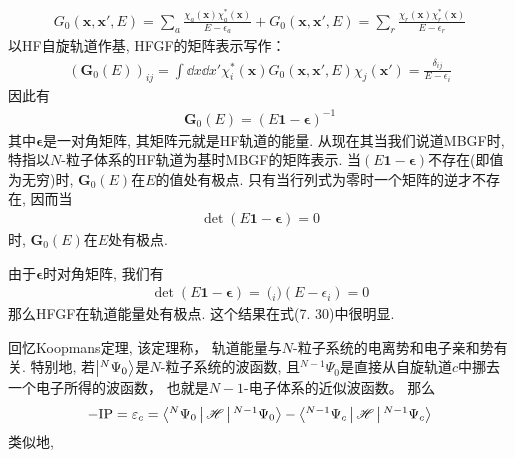 \begin{align}
G_0(\mathbf{x,x'},E) = \sum_a \frac{\chi_a(\mathbf{x})\chi_a^*(\mathbf{x})}{E-\epsilon_a} + G_0(\mathbf{x,x'},E) = \sum_r \frac{\chi_r(\mathbf{x})\chi_r^*(\mathbf{x})}{E-\epsilon_r}
\end{align}
以HF自旋轨道作基, 
HFGF的矩阵表示写作：
\begin{align}
(\mathbf{G}_0(E))_{ij} = \int\dd{x}\dd{x'}\chi_i^*(\mathbf{x})G_0(\mathbf{x,x'},E)\chi_j(\mathbf{x'}) = \frac{\delta_{ij}}{E - \epsilon_i}
\end{align}
因此有
\begin{align}
\mathbf{G}_0(E) = (E\mathbf{1} - \bm{\epsilon})^{-1}
\end{align}
其中$\bm{\epsilon}$是一对角矩阵, 
其矩阵元就是HF轨道的能量. 
从现在其当我们说道MBGF时, 
特指以$N$-粒子体系的HF轨道为基时MBGF的矩阵表示. 
 当$(E\bm{1-\epsilon})$不存在(即值为无穷)时, 
$\mathbf{G}_0(E)$在$E$的值处有极点. 
只有当行列式为零时一个矩阵的逆才不存在, 
因而当
\begin{align*}
\det(E\bm{1-\epsilon})=0
\end{align*}
时, 
$\mathbf{G}_0(E)$在$E$处有极点.


由于$\bm{\epsilon}$时对角矩阵, 
我们有
\begin{align}
\det(E\bm{1-\epsilon}) = \pod_i (E-\epsilon_i) = 0
\end{align}
那么HFGF在\hft 轨道能量处有极点. 
这个结果在式(7.
30)中很明显.


回忆Koopmans定理, 
该定理称，
轨道能量与$N$-粒子系统的电离势和电子亲和势有关. 
特别地, 
若$\Ket{{}^N\Psi_0}$是$N$-粒子系统的\hft 波函数, 
且${}^{N-1}\Psi_0$是直接从自旋轨道$c$中挪去一个电子所得的波函数，
也就是$N-1$-电子体系的近似波函数。
那么
\begin{align}
-\mathrm{IP} = \varepsilon_c = \Braket{{}^N\Psi_0|\mathscr{H}|{}^{N-1}\Psi_0} - \Braket{{}^{N-1}\Psi_c|\mathscr{H}|{}^{N-1}\Psi_c}
\end{align}
类似地,

